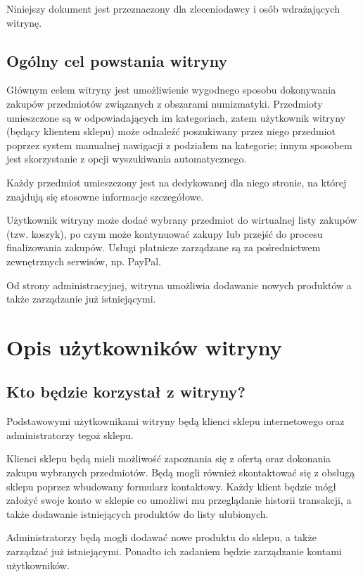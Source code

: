 \documentclass [11pt, a4paper, leqno]	{article}	%
\begin{document}
Niniejszy dokument jest przeznaczony dla zleceniodawcy i osób wdrażających witrynę.

\subsection{Ogólny cel powstania witryny}
\noindent
Głównym celem witryny jest umożliwienie wygodnego sposobu dokonywania zakupów przedmiotów związanych z obszarami numizmatyki. Przedmioty umieszczone są w odpowiadających im kategoriach, zatem użytkownik witryny (będący klientem sklepu) może odnaleźć poszukiwany przez niego przedmiot poprzez system manualnej nawigacji z podziałem na kategorie; innym sposobem jest skorzystanie z opcji wyszukiwania automatycznego. 

Każdy przedmiot umieszczony jest na dedykowanej dla niego stronie, na której znajdują się stosowne informacje szczegółowe. 

Użytkownik witryny może dodać wybrany przedmiot do wirtualnej listy zakupów (tzw. koszyk), po czym może kontynuować zakupy lub przejść do procesu finalizowania zakupów. Usługi płatnicze zarządzane są za pośrednictwem zewnętrznych serwisów, np. PayPal. 

Od strony administracyjnej, witryna umożliwia dodawanie nowych produktów a także zarządzanie już istniejącymi.

\section{Opis użytkowników witryny}

\subsection{Kto będzie korzystał z witryny?}
\noindent
Podstawowymi użytkownikami witryny będą klienci sklepu internetowego oraz administratorzy tegoż sklepu. 

Klienci sklepu będą mieli możliwość zapoznania się z ofertą oraz dokonania zakupu wybranych przedmiotów. Będą mogli również skontaktować się z obsługą sklepu poprzez wbudowany formularz kontaktowy. Każdy klient będzie mógł założyć swoje konto w sklepie co umożliwi mu przeglądanie historii transakcji, a także dodawanie istniejących produktów do listy ulubionych.

Administratorzy będą mogli dodawać nowe produktu do sklepu, a także zarządzać już istniejącymi. Ponadto ich zadaniem będzie zarządzanie kontami użytkowników.  
\end{document}
